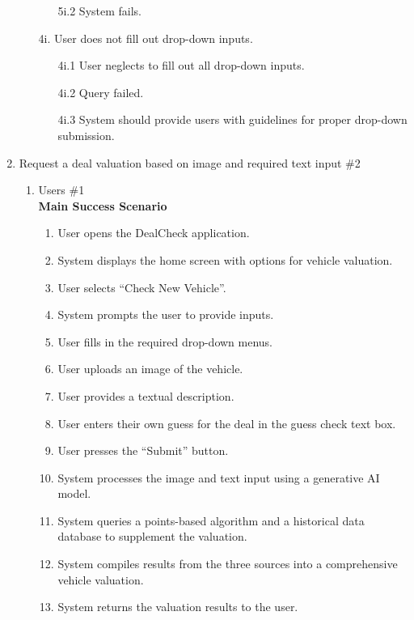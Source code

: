 \documentclass[]{article}
\begin{document}
\begin{enumerate}[{\bf {BE}1.}]
\begin{enumerate}
\begin{enumerate}
        \item[5i.2] System fails.
      \end{enumerate}
      \item[4i.] User does not fill out drop-down inputs.
      \begin{enumerate}
        \item[4i.1] User neglects to fill out all drop-down inputs.
        \item[4i.2] Query failed.
        \item[4i.3] System should provide users with guidelines for proper drop-down submission.
      \end{enumerate}
    \end{enumerate}

\item Request a deal valuation based on image and required text input \#2
    \begin{enumerate}[{\bf VP1.}]
      \item Users \#1 \\
        \textbf{Main Success Scenario}
        \begin{enumerate}[1.]
          \item User opens the DealCheck application.
          \item System displays the home screen with options for vehicle valuation.
          \item User selects ``Check New Vehicle''.
          \item System prompts the user to provide inputs.
          \item User fills in the required drop-down menus.
          \item User uploads an image of the vehicle.
          \item User provides a textual description.
          \item User enters their own guess for the deal in the guess check text box.
          \item User presses the ``Submit'' button.
          \item System processes the image and text input using a generative AI model.
          \item System queries a points-based algorithm and a historical data database to supplement the valuation.
          \item System compiles results from the three sources into a comprehensive vehicle valuation.
          \item System returns the valuation results to the user.

\end{enumerate}
\end{enumerate}
\end{enumerate}
\end{document}
